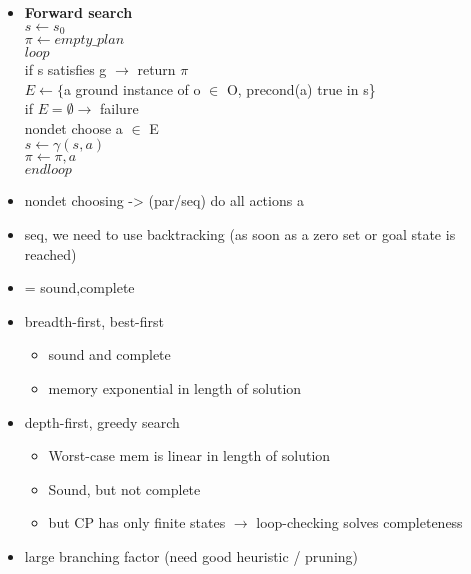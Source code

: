 \begin{itemize}
\item \textbf{Forward search}
\\
$s \leftarrow s_0$\\
$\pi \leftarrow empty\_plan$\\
$loop$\\
if s satisfies g $\rightarrow$ return $\pi$\\
$E \leftarrow \{$a ground instance of o $\in$ O, precond(a) true in s\}\\
if $E=\emptyset \rightarrow$ failure\\
nondet choose a $\in$ E\\
$s \leftarrow \gamma(s,a)$\\
$\pi \leftarrow \pi,a$\\
$endloop$
\item nondet choosing -> (par/seq) do all actions a
\item seq, we need to use backtracking (as soon as a zero set or goal state is reached)
\item = sound,complete
\item breadth-first, best-first
	\begin{itemize}
	\item sound and complete
	\item memory exponential in length of solution
	\end{itemize}
\item depth-first, greedy search
	\begin{itemize}
	\item Worst-case mem is linear in length of solution
	\item Sound, but not complete 
	\item but CP has only finite states $\rightarrow$ loop-checking solves completeness
	\end{itemize}	
\item large branching factor (need good heuristic / pruning)


\end{itemize}
